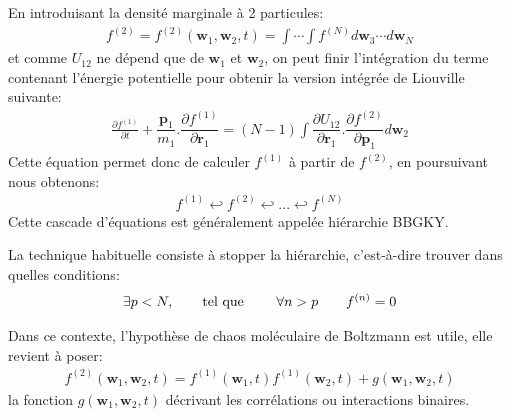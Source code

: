 En introduisant la densité marginale à 2 particules:
\begin{align*}
	f^{(2)}=f^{(2)}(\mathbf{w}_{1},\mathbf{w}_{2},t)=\int\cdots\int f^{(N)}d\mathbf{w}_{3}\cdots d\mathbf{w}_{N}
\end{align*}
et comme $U_{12}$ ne dépend que de $\mathbf{w}_{1}$ et $\mathbf{w}_{2}$, on peut finir l'intégration du terme contenant l'énergie potentielle pour
obtenir la version intégrée de Liouville suivante:
\begin{align}
	\frac{\partial f^{(1)}}{\partial t}+\dfrac{\mathbf{p}_{1}}{m_{1}}.\dfrac{\partial f^{(1)}}{\partial\mathbf{r}_{1}}=\left(  N-1\right)
	\displaystyle \int\dfrac{\partial U_{12}}{\partial\mathbf{r}_{1}}.\dfrac{\partial f^{(2)}}{\partial\mathbf{p}_{1}}d\mathbf{w}_{2}%
	\label{liouint}%
\end{align}
Cette équation permet donc de calculer $f^{(1)}$ à partir de $f^{(2)}$, en poursuivant nous obtenons:
\begin{align*}
	f^{(1)}\hookleftarrow f^{(2)}\hookleftarrow...\hookleftarrow f^{(N)}
\end{align*}
Cette cascade d'équations est généralement appelée
hiérarchie BBGKY.

La technique habituelle consiste à stopper la hiérarchie, c'est-à-dire trouver dans quelles conditions:
\begin{align*}
	\exists p<N,\qquad\text{tel que \qquad}\forall n>p\qquad f^{\left(  n\right) }=0
\end{align*}


Dans ce contexte, l'hypothèse de chaos moléculaire de Boltzmann est utile, elle revient à poser:
\begin{align*}
	f^{(2)}(\mathbf{w}_{1},\mathbf{w}_{2},t)=f^{(1)}(\mathbf{w}_{1},t)f^{(1)}(\mathbf{w}_{2},t)+g(\mathbf{w}_{1},\mathbf{w}_{2},t)
\end{align*}
la fonction $g(\mathbf{w}_{1},\mathbf{w}_{2},t)$ décrivant les corrélations ou interactions binaires.

